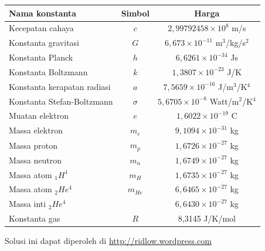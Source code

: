 \documentclass[11pt,fleqn, a4paper]{exam}
\begin{document}
\begin{table}[ht]
\centering
\label{tab:konstanta03}
\renewcommand{\arraystretch}{1.4}
\begin{tabular}{|l|c|c|}
\hline
\textbf{Nama konstanta} & \textbf{Simbol} & \textbf{Harga}\\
\hline
\hline
Kecepatan cahaya & $c$ & $2,99792458 \times 10^{8}$ m/s\\
\hline
Konstanta gravitasi & $G$ & $6,673 \times 10^{-11}$ m$^{3}$/kg/s$^{2}$\\
\hline
Konstanta Planck & $h$ & $6,6261 \times 10^{-34}$ Js\\
\hline
Konstanta Boltzmann & $k$ & $1,3807 \times 10^{-23}$ J/K\\
\hline
Konstanta kerapatan radiasi & $a$ & $7,5659 \times 10^{-16}$ J/m$^3$/K$^4$\\
\hline
Konstanta Stefan-Boltzmann & $\sigma$ & $5,6705 \times 10^{-8}$ Watt/m$^2$/K$^4$\\
\hline
Muatan elektron & $e$ & $1,6022 \times 10^{-19}$ C\\
\hline
Massa elektron & $m_e$ & $9,1094 \times 10^{-31}$ kg\\
\hline
Massa proton & $m_p$ & $1,6726 \times 10^{-27}$ kg\\
\hline
Massa neutron & $m_n$ & $1,6749 \times 10^{-27}$ kg\\
\hline
Massa atom $_{1}H^{1}$ & $m_H$ & $1,6735 \times 10^{-27}$ kg\\
\hline
Massa atom $_{2}He^{4}$ & $m_{He}$ & $6,6465 \times 10^{-27}$ kg\\
\hline
Massa inti $_{2}He^{4}$ &  & $6,6430 \times 10^{-27}$ kg\\
\hline
Konstanta gas & $R$ & 8,3145 J/K/mol\\
\hline
\end{tabular} 
\end{table}

\vspace{1cm}
\begin{flushright}
Solusi ini dapat diperoleh di \href{http://ridlow.wordpress.com}{http://ridlow.wordpress.com}
\end{flushright}
\end{document}
